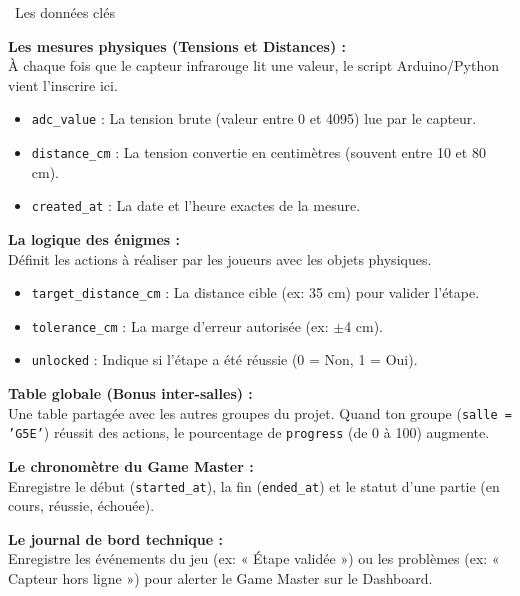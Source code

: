 \documentclass[12pt,a4paper]{article}
\begin{document}
\begin{conceptbox}{\faDatabase\ Les données clés}
\begin{description}[leftmargin=4.5cm, style=nextline]
    \item[\texttt{g5e\_capteur\_logs}] \textbf{Les mesures physiques (Tensions et Distances) :}\\
    À chaque fois que le capteur infrarouge lit une valeur, le script Arduino/Python vient l'inscrire ici.
    \begin{itemize}
        \item \texttt{adc\_value} : La tension brute (valeur entre 0 et 4095) lue par le capteur.
        \item \texttt{distance\_cm} : La tension convertie en centimètres (souvent entre 10 et 80 cm).
        \item \texttt{created\_at} : La date et l'heure exactes de la mesure.
    \end{itemize}

    \item[\texttt{g5e\_enigme\_steps}] \textbf{La logique des énigmes :}\\
    Définit les actions à réaliser par les joueurs avec les objets physiques.
    \begin{itemize}
        \item \texttt{target\_distance\_cm} : La distance cible (ex: 35 cm) pour valider l'étape.
        \item \texttt{tolerance\_cm} : La marge d'erreur autorisée (ex: $\pm$4 cm).
        \item \texttt{unlocked} : Indique si l'étape a été réussie (0 = Non, 1 = Oui).
    \end{itemize}

    \item[\texttt{progression}] \textbf{Table globale (Bonus inter-salles) :}\\
    Une table partagée avec les autres groupes du projet. Quand ton groupe (\texttt{salle = 'G5E'}) réussit des actions, le pourcentage de \texttt{progress} (de 0 à 100) augmente.

    \item[\texttt{g5e\_game\_sessions}] \textbf{Le chronomètre du Game Master :}\\
    Enregistre le début (\texttt{started\_at}), la fin (\texttt{ended\_at}) et le statut d'une partie (en cours, réussie, échouée).

    \item[\texttt{g5e\_alerts}] \textbf{Le journal de bord technique :}\\
    Enregistre les événements du jeu (ex: « Étape validée ») ou les problèmes (ex: « Capteur hors ligne ») pour alerter le Game Master sur le Dashboard.
\end{description}
\end{conceptbox}
\end{document}
